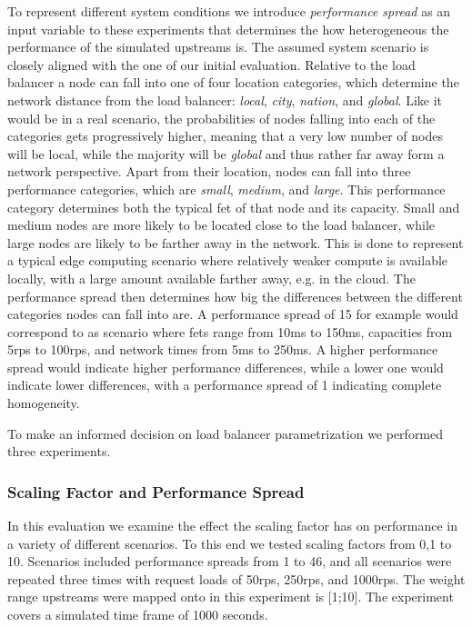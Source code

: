 \documentclass[draft,final]{vutinfth} %
\begin{document}
To represent different system conditions we introduce \textit{performance spread} as an input variable to these experiments that determines the how heterogeneous the performance of the simulated upstreams is.
The assumed system scenario is closely aligned with the one of our initial evaluation.
Relative to the load balancer a node can fall into one of four location categories, which determine the network distance from the load balancer: \textit{local}, \textit{city}, \textit{nation}, and \textit{global}.
Like it would  be in a real scenario, the probabilities of nodes falling into each of the categories gets progressively higher, meaning that a very low number of nodes will be local, while the majority will be \textit{global} and thus rather far away form a network perspective.
Apart from their location, nodes can fall into three performance categories, which are \textit{small}, \textit{medium}, and \textit{large}.
This performance category determines both the typical \gls{fet} of that node and its capacity.
Small and medium nodes are more likely to be located close to the load balancer, while large nodes are likely to be farther away in the network.
This is done to represent a typical edge computing scenario where relatively weaker compute is available locally, with a large amount available farther away, e.g. in the cloud.
The performance spread then determines how big the differences between the different categories nodes can fall into are.
A performance spread of 15 for example would correspond to as scenario where \glspl{fet} range from 10ms to 150ms, capacities from 5\gls{rps} to 100\gls{rps}, and network times from 5ms to 250ms.
A higher performance spread would indicate higher performance differences, while a lower one would indicate lower differences, with a performance spread of 1 indicating complete homogeneity.


To make an informed decision on load balancer parametrization we performed three experiments.
\subsubsection{Scaling Factor and Performance Spread}
In this evaluation we examine the effect the scaling factor has on performance in a variety of different scenarios.
To this end we tested scaling factors from 0,1 to 10.
Scenarios included performance spreads from 1 to 46, and all scenarios were repeated three times with request loads of 50\gls{rps}, 250\gls{rps}, and 1000\gls{rps}.
The weight range upstreams were mapped onto in this experiment is [1;10].
The experiment covers a simulated time frame of 1000 seconds.
\end{document}
